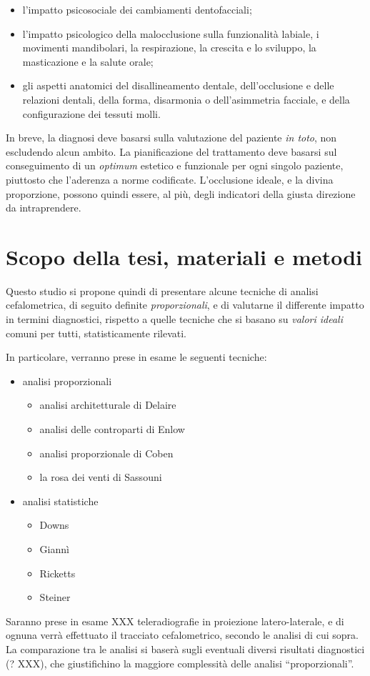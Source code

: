 \begin{itemize}
\item l'impatto psicosociale dei cambiamenti dentofacciali;
\item l'impatto psicologico della malocclusione sulla funzionalità labiale, i movimenti mandibolari, la respirazione, la crescita e lo sviluppo, la masticazione e la salute orale;
\item gli aspetti anatomici del disallineamento dentale, dell'occlusione e delle relazioni dentali, della forma, disarmonia o dell'asimmetria facciale, e della configurazione dei tessuti molli.
\end{itemize}

In breve, la diagnosi deve basarsi sulla valutazione del paziente \textit{in toto}, non escludendo alcun ambito. La pianificazione del trattamento deve basarsi sul conseguimento di un \textit{optimum} estetico e funzionale per ogni singolo paziente, piuttosto che l'aderenza a norme codificate. L'occlusione ideale, e la divina proporzione, possono quindi essere, al più, degli indicatori della giusta direzione da intraprendere.

\section{Scopo della tesi, materiali e metodi}
Questo studio si propone quindi di presentare alcune tecniche di analisi cefalometrica, di seguito definite \textit{proporzionali}, e di valutarne il differente impatto in termini diagnostici, rispetto a quelle tecniche che si basano su \textit{valori ideali} comuni per tutti, statisticamente rilevati.

In particolare, verranno prese in esame le seguenti tecniche:
\begin{itemize}
\item analisi proporzionali
\begin{itemize}
\item analisi architetturale di Delaire
\item analisi delle controparti di Enlow
\item analisi proporzionale di Coben
\item la rosa dei venti di Sassouni
\end{itemize}
\item analisi statistiche
\begin{itemize}
\item Downs
\item Giannì
\item Ricketts
\item Steiner
\end{itemize}
\end{itemize}

Saranno prese in esame XXX teleradiografie in proiezione latero-laterale, e di ognuna verrà effettuato il tracciato cefalometrico, secondo le analisi di cui sopra. La comparazione tra le analisi si baserà sugli eventuali diversi risultati diagnostici (? XXX), che giustifichino la maggiore complessità delle analisi ``proporzionali''.
